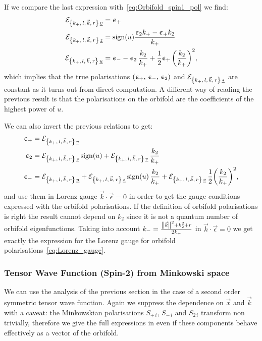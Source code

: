 If we compare the last expression with~\eqref{eq:Orbifold_spin1_pol} we find:
\begin{equation}
  \begin{split}
    \mathcal{E}_{\qty{k_+,\, l,\, \vec{k},\, r}\, \underline{v}}
    & =
    \upepsilon_+
    \\
    \mathcal{E}_{\qty{k_+,\, l,\, \vec{k},\, r}\, \underline{z}}
    & =
    \mathrm{sign}(u)
    \frac{\upepsilon_2 k_+ -\upepsilon_+ k_2}{k_+}
    \\
    \mathcal{E}_{\qty{k_+,\, l,\, \vec{k},\, r}\, \underline{u}}
    & =
    \upepsilon_-
    -
    \upepsilon_2\, \frac{k_2}{k_+}
    +
    \frac{1}{2} \upepsilon_+\, \qty( \frac{k_2}{k_+} )^2,
  \end{split}
  \label{eq:eps_calE}
\end{equation}
which implies that the true polarisations $\qty(\upepsilon_+,\, \upepsilon_-,\, \upepsilon_2)$  and $\mathcal{E}_{\qty{k_+,\, l,\, \vec{k},\, r}\, \underline{*}}$ are constant as it turns out from direct computation.
A different way of reading the previous result is that the polarisations on the orbifold are the coefficients of the highest power of $u$.

We can also invert the previous relations to get:
\begin{equation}
  \begin{split}
    \upepsilon_+
    & =
    \mathcal{E}_{\qty{k_+,\, l,\, \vec{k},\, r}\, \underline{v}} 
    \\
    \upepsilon_2
    & =
    \mathcal{E}_{\qty{k_+,\, l,\, \vec{k},\, r}\, \underline{z}}\, \mathrm{sign}(u)
    +
    \mathcal{E}_{\qty{k_+,\, l,\, \vec{k},\, r}\, \underline{v}}\, \frac{k_2}{k_+}
    \\
    \upepsilon_-
    & =
    \mathcal{E}_{\qty{k_+,\, l,\, \vec{k},\, r}\, \underline{u}}
    +
    \mathcal{E}_{\qty{k_+,\, l,\, \vec{k},\, r}\, \underline{z}}\, \mathrm{sign}(u)\, \frac{k_2}{k_+}
    +
    \mathcal{E}_{\qty{k_+,\, l,\, \vec{k},\, r}\, \underline{v}}\, \frac{1}{2} \qty( \frac{k_2}{k_+} )^2,
  \end{split}
  \label{eq:calE_eps}
\end{equation}
and use them in Lorenz gauge $\vec{k} \cdot \vec{\epsilon} = 0$ in order to get the gauge conditions expressed with the orbifold polarisations.
If the definition of orbifold polarisations is right the result cannot depend on $k_2$ since it is not a quantum number of orbifold eigenfunctions.
Taking into account $k_- = \frac{\norm{\vec{k}}^2+ k_2^2 + r}{2 k_+}$ in $\vec{k} \cdot \vec{\epsilon} = 0$ we get exactly the expression for the Lorenz gauge for orbifold polarisations~\eqref{eq:Lorenz_gauge}. 


\subsubsection{Tensor Wave Function (Spin-2) from Minkowski space}

We can use the analysis of the previous section in the case of a second order symmetric tensor wave function.
Again we suppress the dependence on $\vec{x}$ and $\vec{k}$ with a caveat: the Minkowskian polarisations $S_{+\, i}$, $S_{-\, i}$ and $S_{2\, i}$ transform non trivially, therefore we give the full expressions in  even if these components behave effectively as a vector of the orbifold.

